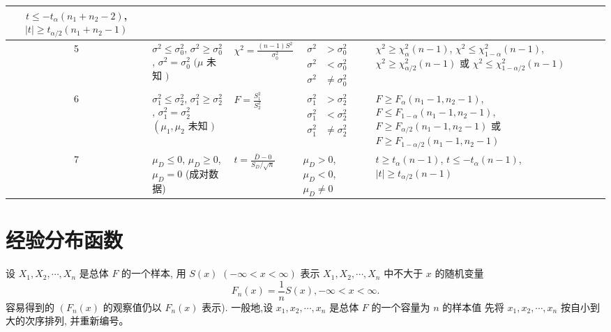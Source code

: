 \begin{table}[]
\begin{tabularx}{1\textwidth}{
         c
        | >{\raggedright\arraybackslash}X
        | >{\raggedright\arraybackslash}X 
        | >{\raggedright\arraybackslash}X 
        | >{\raggedright\arraybackslash}X }
    $ t \leq-t_{\alpha}\left(n_{1}+n_{2}-2\right) $,
    $ |t| \geq t_{\alpha / 2}\left(n_{1}+n_{2}-1\right) $ \\ \hline
    5 & $ \sigma^{2} \leq \sigma_{0}^{2} $,
    $ \sigma^{2} \geq \sigma_{0}^{2} $,
    $ \sigma^{2}=\sigma_{0}^{2} $
    $ (\mu $ 未知 $ ) $ & $ \chi^{2}=\frac{(n-1) S^{2}}{\sigma_{0}^{2}} $ & $ \begin{aligned} \sigma^{2} &>\sigma_{0}^{2} \\ \sigma^{2} &<\sigma_{0}^{2} \\ \sigma^{2} & \neq \sigma_{0}^{2} \end{aligned} $ & $ \chi^{2} \geq \chi_{\alpha}^{2}(n-1) $,
    $ \chi^{2} \leq \chi_{1-\alpha}^{2}(n-1) $,
    $ \chi^{2} \geq \chi_{\alpha / 2}^{2}(n-1) $ 或
    $ \chi^{2} \leq \chi_{1-\alpha / 2}^{2}(n-1) $ \\ \hline
    6 & $ \sigma_{1}^{2} \leq \sigma_{2}^{2} $,
    $ \sigma_{1}^{2} \geq \sigma_{2}^{2} $,
    $ \sigma_{1}^{2}=\sigma_{2}^{2} $
    $ \left(\mu_{1}, \mu_{2}\right. $ 未知 $ ) $ & $ F=\frac{S_{1}^{2}}{S_{2}^{2}} $ & $ \begin{aligned} \sigma_{1}^{2} &>\sigma_{2}^{2} \\ \sigma_{1}^{2} &<\sigma_{2}^{2} \\ \sigma_{1}^{2} & \neq \sigma_{2}^{2} \end{aligned} $ & $ F \geq F_{\alpha}\left(n_{1}-1, n_{2}-1\right) $,
    $ F \leq F_{1-\alpha}\left(n_{1}-1, n_{2}-1\right) $,
    $ F \geq F_{\alpha / 2}\left(n_{1}-1, n_{2}-1\right) $ 或
    $ F \geq F_{1-\alpha / 2}\left(n_{1}-1, n_{2}-1\right) $ \\ \hline
    7 & $ \mu_{D} \leq 0 $,
    $ \mu_{D} \geq 0 $,
    $ \mu_{D}=0 $
    (成对数据) & $ t=\frac{\bar{D}-0}{S_{D} / \sqrt{n}} $ & $ \mu_{D}>0 $,
    $ \mu_{D}<0 $,
    $ \mu_{D} \neq 0 $ &  $ t \geq t_{\alpha}(n-1) $,
    $ t \leq-t_{\alpha}(n-1) $,
    $ |t| \geq t_{\alpha / 2}(n-1) $\\ \hline
    
    \end{tabularx}
\end{table}

\section{经验分布函数}

设 $ X_{1}, X_{2}, \cdots, X_{n} $ 是总体 $ {F} $ 的一个样本, 用 $ S({x}) $
$ (-\infty<x<\infty) $ 表示 $ X_{1}, X_{2}, \cdots, X_{n} $ 中不大于 $ x $ 的随机变量
$$
F_{n}(x)=\frac{1}{n} S(x),-\infty<x<\infty .
$$
容易得到的 $ \left({F}_{n}({x})\right. $ 的观察值仍以 $ {F}_{n}({x}) $ 表示). 
一般地,设 $ {x}_{1}, {x}_{2}, \cdots, {x}_{n} $ 是总体 $ {F} $ 的一个容量为 $ {n} $ 的样本值
先将 $ {x}_{1}, {x}_{2}, \cdots, {x}_{n} $ 按自小到大的次序排列, 并重新编号。 

